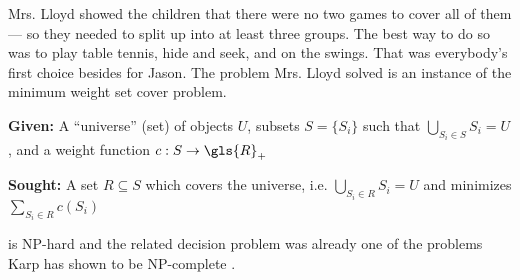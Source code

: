 Mrs. Lloyd showed the children that there were no two games to cover
all of them --- so they needed to split up into at least three groups.
The best way to do so was to play table tennis, hide and seek, and
on the swings. That was everybody's first choice besides for Jason.
The problem Mrs. Lloyd solved is an instance of the minimum weight 
set cover problem.

\begin{problem}\label{prob:mwsc}
  \hfill
  \begin{labeling}{\hspace{4em}}
    \item[\textbf{Given:}]
      A ``universe'' (set) of objects \(U\), 
      subsets \(S = \{S_i\}\)
      such that \(\bigcup\limits_{S_i \in S} S_i = U\),
      and a weight function \(c : S \to \gls{R}_+\)
    \item[\textbf{Sought:}]
      A set \(R \subseteq S\)
      which covers the universe, i.e. 
      \(\bigcup\limits_{S_i \in R} S_i = U\)
      and minimizes \(\sum\limits_{S_i \in R} c(S_i)\)
  \end{labeling}
\end{problem}

 is NP-hard \cite{set_cover} and the related decision 
problem was already one of the problems Karp has shown to be 
NP-complete \cite{set_cover_decision}.

